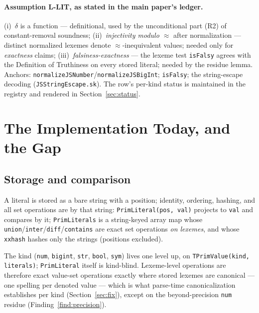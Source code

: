 \documentclass[11pt]{article}
\begin{document}
\paragraph{Assumption L-LIT, as stated in the main paper's ledger.}
(i)~$\delta$ is a function --- definitional, used by the unconditional part
(R2) of constant-removal soundness; (ii)~\emph{injectivity modulo
$\approx$} after normalization --- distinct normalized lexemes denote
$\approx$-inequivalent values; needed only for \emph{exactness} claims;
(iii)~\emph{falsiness-exactness} --- the lexeme test \texttt{isFalsy}
agrees with the Definition of Truthiness on every stored literal; needed
by the residue lemma. Anchors:
\texttt{normalizeJSNumber}/\texttt{normalizeJSBigInt}; \texttt{isFalsy};
the string-escape decoding (\texttt{JSStringEscape.sk}). The row's
per-kind status is maintained in the registry and rendered in
Section~\ref{sec:status}.

\section{The Implementation Today, and the Gap}
\label{sec:today}

\subsection{Storage and comparison}

A literal is stored as a bare string with a position; identity, ordering,
hashing, and all set operations are by that string:
\texttt{PrimLiteral(pos, val)} projects to \texttt{val} and compares by
it; \texttt{PrimLiterals} is a string-keyed array map whose
\texttt{union}/\texttt{inter}/\texttt{diff}/\texttt{contains} are exact
set operations \emph{on lexemes}, and whose \texttt{xxhash} hashes only
the strings (positions excluded).

The kind (\texttt{num}, \texttt{bigint}, \texttt{str}, \texttt{bool},
\texttt{sym}) lives one level up, on
\texttt{TPrimValue(kind, literals)}; \texttt{PrimLiteral} itself is
kind-blind. Lexeme-level operations are therefore exact value-set
operations exactly where stored lexemes are canonical --- one spelling
per denoted value --- which is what parse-time canonicalization
establishes per kind (Section~\ref{sec:fix}), except on the
beyond-precision \texttt{num} residue (Finding~\ref{find:precision}).
\end{document}
